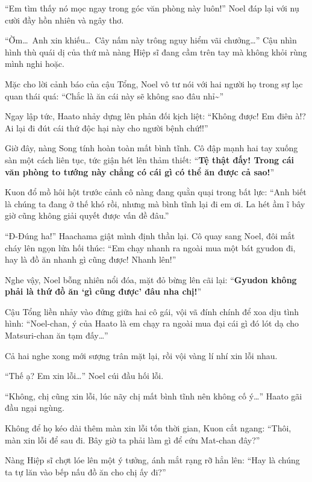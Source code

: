 \documentclass[../main.tex]{subfiles}
\begin{document}
``Em tìm thấy nó mọc ngay trong góc văn phòng này luôn!'' Noel đáp lại với nụ cười đầy hồn nhiên và ngây thơ.

``Ờm\dots\ Anh xin khiếu\dots\ Cây nấm này trông nguy hiểm vãi chưởng\dots'' Cậu nhìn hình thù quái dị của thứ mà nàng Hiệp sĩ đang cầm trên tay mà không khỏi rùng mình nghi hoặc.

Mặc cho lời cảnh báo của cậu Tổng, Noel vô tư nói với hai người họ trong sự lạc quan thái quá: ``Chắc là ăn cái này sẽ không sao đâu nhỉ\~{}''

Ngay lập tức, Haato nhảy dựng lên phản đối kịch liệt: ``Không được! Em điên à!? Ai lại đi đút cái thứ độc hại này cho người bệnh chứ!!''

Giờ đây, nàng Song tính hoàn toàn mất bình tĩnh. Cô đập mạnh hai tay xuống sàn một cách liên tục, tức giận hét lên thảm thiết: ``\textbf{Tệ thật đấy! Trong cái văn phòng to tướng này chẳng có cái gì có thể ăn được cả sao!}''


Kuon đổ mồ hôi hột trước cảnh cô nàng đang quằn quại trong bất lực: ``Anh biết là chúng ta đang ở thế khó rồi, nhưng mà bình tĩnh lại đi em ơi. La hét ầm ĩ bây giờ cũng không giải quyết được vấn đề đâu.''

``Đ-Đúng ha!'' Haachama giật mình định thần lại. Cô quay sang Noel, đôi mắt cháy lên ngọn lửa hối thúc: ``Em chạy nhanh ra ngoài mua một bát gyudon đi, hay là đồ ăn nhanh gì cũng được! Nhanh lên!''

Nghe vậy, Noel bỗng nhiên nổi đóa, mặt đỏ bừng lên cãi lại: ``\textbf{Gyudon không phải là thứ đồ ăn `gì cũng được' đâu nha chị!}''

Cậu Tổng liền nhảy vào đứng giữa hai cô gái, vội vã đính chính để xoa dịu tình hình: ``Noel-chan, ý của Haato là em chạy ra ngoài mua đại cái gì đó lót dạ cho Matsuri-chan ăn tạm đấy\dots''

Cả hai nghe xong mới sượng trân mặt lại, rồi vội vàng lí nhí xin lỗi nhau.

``Thế ạ? Em xin lỗi\dots'' Noel cúi đầu hối lỗi.

``Không, chị cũng xin lỗi, lúc nãy chị mất bình tĩnh nên không cố ý\dots'' Haato gãi đầu ngại ngùng.

Không để họ kéo dài thêm màn xin lỗi tốn thời gian, Kuon cắt ngang: ``Thôi, màn xin lỗi để sau đi. Bây giờ ta phải làm gì để cứu Mat-chan đây?''

Nàng Hiệp sĩ chợt lóe lên một ý tưởng, ánh mắt rạng rỡ hẳn lên: ``Hay là chúng ta tự lăn vào bếp nấu đồ ăn cho chị ấy đi?''
\end{document}
